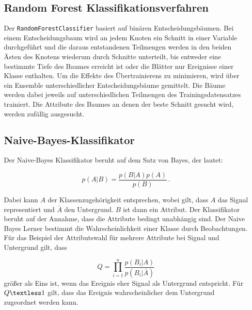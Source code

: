 \subsection{Random Forest Klassifikationsverfahren}
Der \texttt{RandomForestClassifier} basiert auf binären Entscheidungsbäumen.
Bei einem Entscheidungsbaum wird an jedem Knoten ein Schnitt in einer Variable durchgeführt und die daraus entstandenen Teilmengen 
werden in den beiden Ästen des Knotens wiederum durch Schnitte unterteilt, bis entweder eine bestimmte Tiefe
des Baumes erreicht ist oder die Blätter nur Ereignisse einer Klasse enthalten. Um die Effekte des Übertrainierens zu minimieren, wird über ein Ensemble unterschiedlicher
Entscheidungsbäume gemittelt.
Die Bäume werden dabei jeweils auf unterschiedlichen Teilmengen des Trainingsdatensatzes trainiert.
Die Attribute des Baumes an denen der beste Schnitt gesucht wird, werden zufällig ausgesucht.

\subsection{Naive-Bayes-Klassifikator}
Der Naive-Bayes Klassifikator beruht auf dem Satz von Bayes, der lautet:

\begin{equation*}
    p\left(A|B \right) = \frac{p\left(B|A \right) p\left(A \right)}{p\left(B \right)} \, .
\end{equation*}

Dabei kann $A$ der Klassenzugehörigkeit entsprechen, wobei gilt, dass 
$A$ das Signal representiert und $\bar{A}$ den Untergrund. $B$ ist dann ein 
Attribut. Der Klassifikator beruht auf der Annahme, dass die Attribute bedingt 
unabhängig sind. Der Naive Bayes Lerner bestimmt die Wahrscheinlichkeit einer 
Klasse durch Beobachtungen. Für das Beispiel der Attributswahl für 
mehrere Attribute bei Signal und 
Untergrund gilt, dass

\begin{equation*}
    Q = \prod\limits_{i = 1}^{n} \frac{p\left(B_i|A \right)}{p\left(B_i|\bar{A} \right)}
\end{equation*}
größer als Eins ist, wenn das Ereignis eher Signal als Untergrund entspricht. 
Für $Q \textless 1$ gilt, dass das Ereignis wahrscheinlicher dem Untergrund 
zugeordnet werden kann.

